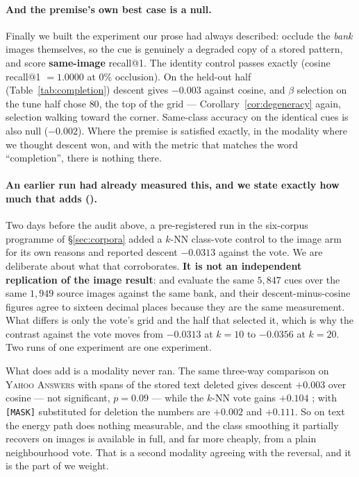\paragraph{And the premise's own best case is a null.} Finally we built the experiment our
prose had always described: occlude the \emph{bank} images themselves, so the cue is
genuinely a degraded copy of a stored pattern, and score \textbf{same-image} recall@1.
The identity control passes exactly (cosine recall@1 $=1.0000$ at $0\%$ occlusion). On the
held-out half (Table~\ref{tab:completion}) descent gives $-0.003$ 
against cosine, and $\beta$ selection on the tune half chose $80$, the top of the grid ---
Corollary~\ref{cor:degeneracy} again, selection walking toward the corner. Same-class
accuracy on the identical cues is also null ($-0.002$). Where the premise is satisfied
exactly, in the modality where we thought descent won, and with the metric that matches the
word ``completion'', there is nothing there.

\paragraph{An earlier run had already measured this, and we state exactly how much that
adds ().} Two days before the audit above, a pre-registered run in the six-corpus
programme of \S\ref{sec:corpora} added a $k$-NN class-vote control to the image arm for its
own reasons and reported descent $-0.0313$  against the vote. We are
deliberate about what that corroborates. \textbf{It is not an independent replication of the
image result}:  and  evaluate the same $5{,}847$ cues over the same
$1{,}949$ source images against the same bank, and their descent-minus-cosine figures agree
to sixteen decimal places because they are the same measurement. What differs is only the
vote's grid and the half that selected it, which is why the contrast against the vote moves
from $-0.0313$ at $k{=}10$ to $-0.0356$ at $k{=}20$. Two runs of one experiment are one
experiment.

What  does add is a modality  never ran. The same three-way comparison on
\textsc{Yahoo Answers} with spans of the stored text deleted gives descent $+0.003$
 over cosine --- not significant, $p{=}0.09$ --- while the $k$-NN vote
gains $+0.104$ ; with \texttt{[MASK]} substituted for deletion the
numbers are $+0.002$ and $+0.111$. So on text the energy path does nothing measurable, and
the class smoothing it partially recovers on images is available in full, and far more
cheaply, from a plain neighbourhood vote. That is a second modality agreeing with the
reversal, and it is the part of  we weight.

